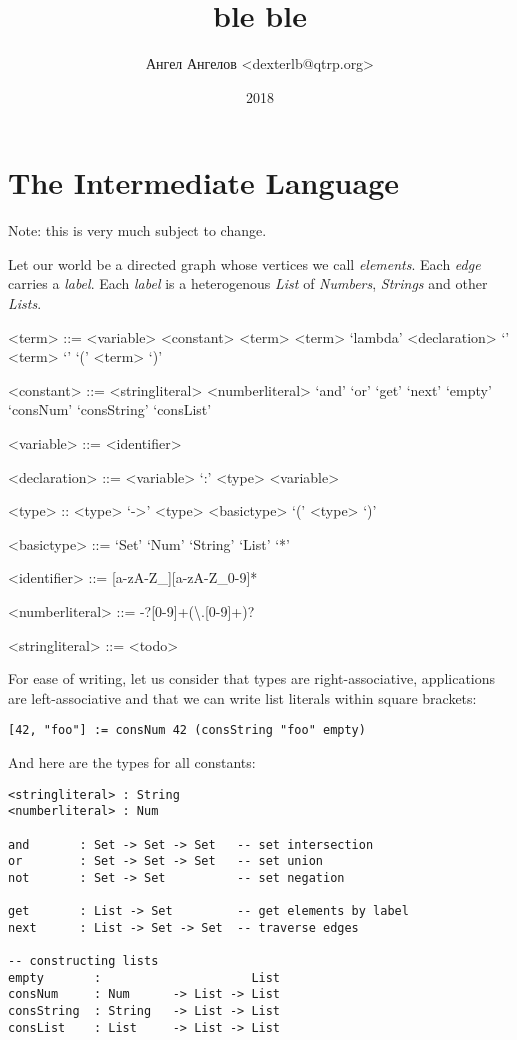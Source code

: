 \documentclass[12pt]{extarticle}
\title{ble ble}
\author{Ангел Ангелов <dexterlb@qtrp.org>}
\date{2018}
\begin{document}

\section{The Intermediate Language}
Note: this is very much subject to change.

Let our world be a directed graph whose vertices we call \emph{elements}.
Each \emph{edge} carries a \emph{label}. Each \emph{label} is a heterogenous
\emph{List} of \emph{Numbers}, \emph{Strings} and other \emph{Lists}.

\begin{grammar}

<term> ::= <variable>
\alt <constant>
\alt <term> <term>
\alt `lambda' <declaration> `{' <term> `}'
\alt `(' <term> `)'

<constant> ::= <stringliteral>
          \alt <numberliteral>
          \alt `and'
          \alt `or'
          \alt `get'
          \alt `next'
          \alt `empty'
          \alt `consNum'
          \alt `consString'
          \alt `consList'


<variable> ::= <identifier>

<declaration> ::= <variable> `:' <type>
\alt <variable>

<type> :: <type> `->' <type>
\alt <basictype>
\alt `(' <type> `)'

<basictype> ::= `Set'
\alt `Num'
\alt `String'
\alt `List'
\alt `*'

<identifier> ::= [a-zA-Z_][a-zA-Z_0-9]*

<numberliteral>     ::= -?[0-9]+(\textbackslash.[0-9]+)?

<stringliteral>     ::= <todo>
\end{grammar}

For ease of writing, let us consider that types are right-associative,
applications are left-associative and that we can write list literals
within square brackets:
\begin{lstlisting}
[42, "foo"] := consNum 42 (consString "foo" empty)
\end{lstlisting}

And here are the types for all constants:

\begin{lstlisting}
<stringliteral> : String
<numberliteral> : Num

and       : Set -> Set -> Set   -- set intersection
or        : Set -> Set -> Set   -- set union
not       : Set -> Set          -- set negation

get       : List -> Set         -- get elements by label
next      : List -> Set -> Set  -- traverse edges

-- constructing lists
empty       :                     List
consNum     : Num      -> List -> List
consString  : String   -> List -> List
consList    : List     -> List -> List

\end{lstlisting}
\end{document}

